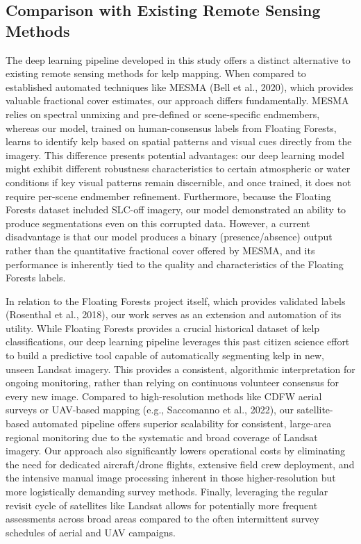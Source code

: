 \documentclass{article}
\begin{document}
\subsection{Comparison with Existing Remote Sensing Methods}

The deep learning pipeline developed in this study offers a distinct alternative to existing remote sensing methods for kelp mapping. When compared to established automated techniques like MESMA (Bell et al., 2020), which provides valuable fractional cover estimates, our approach differs fundamentally. MESMA relies on spectral unmixing and pre-defined or scene-specific endmembers, whereas our model, trained on human-consensus labels from Floating Forests, learns to identify kelp based on spatial patterns and visual cues directly from the imagery. This difference presents potential advantages: our deep learning model might exhibit different robustness characteristics to certain atmospheric or water conditions if key visual patterns remain discernible, and once trained, it does not require per-scene endmember refinement. Furthermore, because the Floating Forests dataset included SLC-off imagery, our model demonstrated an ability to produce segmentations even on this corrupted data. However, a current disadvantage is that our model produces a binary (presence/absence) output rather than the quantitative fractional cover offered by MESMA, and its performance is inherently tied to the quality and characteristics of the Floating Forests labels.

In relation to the Floating Forests project itself, which provides validated labels (Rosenthal et al., 2018), our work serves as an extension and automation of its utility. While Floating Forests provides a crucial historical dataset of kelp classifications, our deep learning pipeline leverages this past citizen science effort to build a predictive tool capable of automatically segmenting kelp in new, unseen Landsat imagery. This provides a consistent, algorithmic interpretation for ongoing monitoring, rather than relying on continuous volunteer consensus for every new image. Compared to high-resolution methods like CDFW aerial surveys or UAV-based mapping (e.g., Saccomanno et al., 2022), our satellite-based automated pipeline offers superior scalability for consistent, large-area regional monitoring due to the systematic and broad coverage of Landsat imagery. Our approach also significantly lowers operational costs by eliminating the need for dedicated aircraft/drone flights, extensive field crew deployment, and the intensive manual image processing inherent in those higher-resolution but more logistically demanding survey methods. Finally, leveraging the regular revisit cycle of satellites like Landsat allows for potentially more frequent assessments across broad areas compared to the often intermittent survey schedules of aerial and UAV campaigns.
\end{document}
